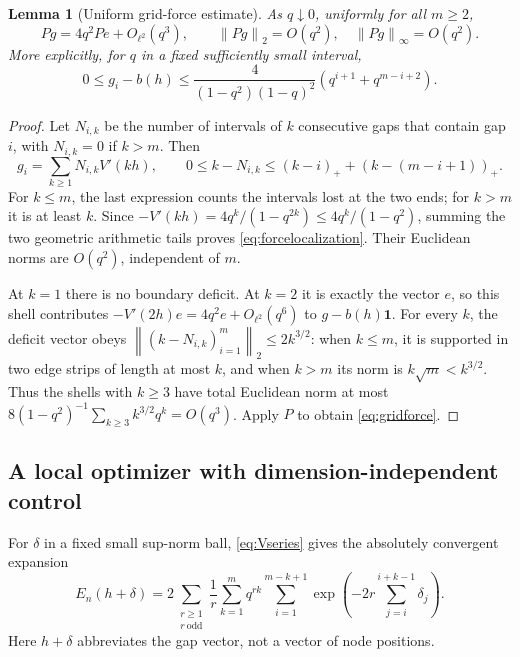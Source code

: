 \documentclass[11pt,a4paper]{article}
\newtheorem{lemma}[theorem]{Lemma}
\theoremstyle{definition}
\theoremstyle{remark}
\newcommand{\ones}{\mathbf 1}
\newcommand{\norm}[1]{\left\lVert#1\right\rVert}
\begin{document}
\begin{lemma}[Uniform grid-force estimate]
\label{lem:gridforce}
As $q\downarrow0$, uniformly for all $m\ge2$,
\begin{equation}
 Pg=4q^2Pe+O_{\ell^2}(q^3),\qquad
 \norm{Pg}_2=O(q^2),\quad\norm{Pg}_\infty=O(q^2).
 \label{eq:gridforce}
\end{equation}
More explicitly, for $q$ in a fixed sufficiently small interval,
\begin{equation}
 0\le g_i-b(h)\le
 \frac4{(1-q^2)(1-q)^2}\left(q^{i+1}+q^{m-i+2}\right).
 \label{eq:forcelocalization}
\end{equation}
\end{lemma}
\begin{proof}
Let $N_{i,k}$ be the number of intervals of $k$ consecutive gaps that
contain gap $i$, with $N_{i,k}=0$ if $k>m$. Then
\[
 g_i=\sum_{k\ge1}N_{i,k}V'(kh),\qquad
 0\le k-N_{i,k}\le(k-i)_++(k-(m-i+1))_+.
\]
For $k\le m$, the last expression counts the intervals lost at the two
ends; for $k>m$ it is at least $k$. Since
$-V'(kh)=4q^k/(1-q^{2k})\le4q^k/(1-q^2)$, summing the two geometric
arithmetic tails proves \eqref{eq:forcelocalization}.
Their Euclidean norms are $O(q^2)$, independent of $m$.

At $k=1$ there is no boundary deficit. At $k=2$ it is exactly the vector
$e$, so this shell contributes $-V'(2h)e=4q^2e+O_{\ell^2}(q^6)$ to
$g-b(h)\ones$. For every $k$, the deficit vector obeys
$\norm{(k-N_{i,k})_{i=1}^m}_2\le2k^{3/2}$: when $k\le m$, it is
supported in two edge strips of length at most $k$, and when $k>m$
its norm is $k\sqrt m<k^{3/2}$. Thus the shells with $k\ge3$ have
total Euclidean norm at most
$8(1-q^2)^{-1}\sum_{k\ge3}k^{3/2}q^k=O(q^3)$.
Apply $P$ to obtain \eqref{eq:gridforce}.
\end{proof}

\subsection{A local optimizer with dimension-independent control}
For $\delta$ in a fixed small sup-norm ball, \eqref{eq:Vseries} gives the
absolutely convergent expansion
\begin{equation}
 E_n(h+\delta)=2\sum_{\substack{r\ge1\\r\ \mathrm{odd}}}\frac1r
 \sum_{k=1}^m q^{rk}
 \sum_{i=1}^{m-k+1}
 \exp\left(-2r\sum_{j=i}^{i+k-1}\delta_j\right).
 \label{eq:Eexpanded}
\end{equation}
Here $h+\delta$ abbreviates the gap vector, not a vector of node positions.
\end{document}
